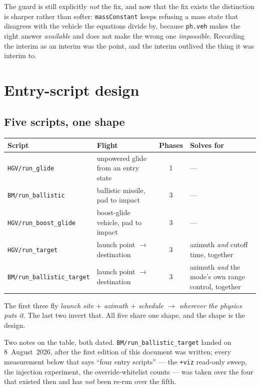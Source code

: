 \documentclass[11pt]{article}
\newcommand{\code}[1]{\texttt{#1}}
\newcommand{\pkg}[1]{\texttt{+#1}}
\begin{document}
The guard is still explicitly \emph{not} the fix, and now that the fix exists
the distinction is sharper rather than softer: \code{massConstant} keeps
refusing a mass state that disagrees with the vehicle the equations divide by,
because \code{ph.veh} makes the right answer \emph{available} and does not
make the wrong one \emph{impossible}. Recording the interim as an interim was
the point, and the interim outlived the thing it was interim to.

\section{Entry-script design}
\label{sec:entry}

\subsection{Five scripts, one shape}

\begin{center}
\begin{tabular}{llcp{4.0cm}}
\toprule
Script & Flight & Phases & Solves for \\
\midrule
\code{HGV/run\_glide}       & unpowered glide from an entry state & 1 & --- \\
\code{BM/run\_ballistic}    & ballistic missile, pad to impact    & 3 & --- \\
\code{HGV/run\_boost\_glide}& boost-glide vehicle, pad to impact  & 3 & --- \\
\code{HGV/run\_target}      & launch point $\to$ destination      & 3 & azimuth \emph{and} cutoff time, together \\
\code{BM/run\_ballistic\_target} & launch point $\to$ destination & 3 & azimuth \emph{and} the mode's own range control, together \\
\bottomrule
\end{tabular}
\end{center}

The first three fly \emph{launch site $+$ azimuth $+$ schedule $\to$ wherever
the physics puts it}. The last two invert that. All five share one shape, and
the shape is the design.

Two notes on the table, both dated. \code{BM/run\_ballistic\_target} landed on
8~August~2026, after the first edition of this document was written; every
measurement below that says ``four entry scripts'' --- the \pkg{viz}
read-only sweep, the injection experiment, the override-whitelist counts ---
was taken over the four that existed then and has \emph{not} been re-run over
the fifth.
\end{document}
